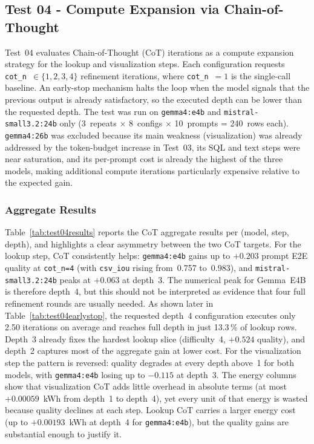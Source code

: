 \subsection{Test 04 - Compute Expansion via Chain-of-Thought}
\label{subsec:res04}

Test~04 evaluates Chain-of-Thought (CoT) iterations as a compute
expansion strategy for the lookup and visualization steps. Each
configuration requests \texttt{cot\_n}~$\in \{1, 2, 3, 4\}$ refinement
iterations, where \texttt{cot\_n}~$= 1$ is the single-call baseline. An
early-stop mechanism halts the loop when the model signals that the
previous output is already satisfactory, so the executed depth can be
lower than the requested depth. The test was run on
\texttt{gemma4:e4b} and \texttt{mistral-\allowbreak small3.2:24b} only
(3~repeats $\times$ 8~configs $\times$ 10~prompts = 240~rows each).
\texttt{gemma4:26b} was excluded because its main weakness (visualization)
was already addressed by the token-budget increase in Test~03, its SQL
and text steps were near saturation, and its per-prompt cost is already
the highest of the three models, making additional compute iterations
particularly expensive relative to the expected gain.

\subsubsection{Aggregate Results}

Table~\ref{tab:test04results} reports the CoT aggregate results per (model, step,
depth), and highlights a clear asymmetry between the two CoT targets.
For the lookup step, CoT consistently helps: \texttt{gemma4:e4b} gains
up to $+0.203$ prompt E2E quality at \texttt{cot\_n=4} (with \texttt{csv\_iou}
rising from~0.757 to~0.983), and \texttt{mistral-\allowbreak small3.2:24b} peaks
at $+0.063$ at depth~3.
The numerical peak for Gemma~E4B is therefore depth~4, but this should
not be interpreted as evidence that four full refinement rounds are
usually needed. As shown later in Table~\ref{tab:test04earlystop}, the
requested depth~4 configuration executes only 2.50 iterations on average
and reaches full depth in just 13.3\,\% of lookup rows. Depth~3 already
fixes the hardest lookup slice (difficulty~4, $+0.524$ quality), and
depth~2 captures most of the aggregate gain at lower cost.
For the visualization step the pattern is reversed: quality degrades
at every depth above~1 for both models, with \texttt{gemma4:e4b}
losing up to $-0.115$ at depth~3.
The energy columns show that visualization CoT adds little overhead in
absolute terms (at most $+0.00059$~kWh from depth~1 to depth~4), yet
every unit of that energy is wasted because quality declines at each
step. Lookup CoT carries a larger energy cost (up to $+0.00193$~kWh at
depth~4 for \texttt{gemma4:e4b}), but the quality gains are
substantial enough to justify it.

